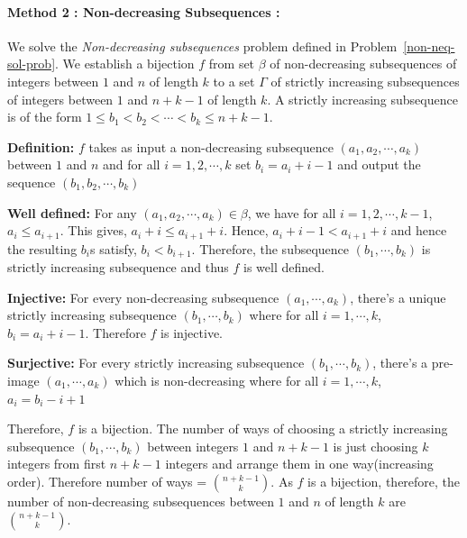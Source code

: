 \paragraph{Method 2 : Non-decreasing Subsequences : } We solve the \emph{Non-decreasing subsequences} problem defined in Problem~\ref{non-neq-sol-prob}. We establish a bijection $f$ from set $\beta$ of non-decreasing subsequences of integers between $1$ and $n$ of length $k$ to a set $\Gamma$ of strictly increasing subsequences of integers between $1$ and $n+k-1$ of length $k$. A strictly increasing subsequence is of the form $1\leq b_1<b_2<\cdots<b_k\leq n+k-1$.
\begin{description}
\item{\textbf{Definition:}} $f$ takes as input a non-decreasing subsequence $(a_1,a_2,\cdots,a_k)$ between $1$ and $n$ and for all $i=1,2,\cdots,k$ set $b_i = a_i+i-1$ and output the sequence $(b_1,b_2,\cdots,b_k)$
\item{\textbf{Well defined:}} For any $(a_1,a_2,\cdots,a_k)\in\beta$, we have for all $i=1,2,\cdots,k-1$, 
$a_i \leq a_{i+1}$. This gives, $a_i+i \leq a_{i+1}+i$. Hence, $a_i+i-1 < a_{i+1}+i$ and hence the resulting $b_i$s satisfy, $b_i < b_{i+1}$.
Therefore, the subsequence $(b_1,\cdots,b_k)$ is strictly increasing subsequence and thus $f$ is well defined.
\item{\textbf{Injective:}} For every non-decreasing subsequence $(a_1,\cdots,a_k)$, there's a unique strictly increasing subsequence $(b_1,\cdots,b_k)$ where for all $i=1,\cdots,k$, $b_i = a_i+i-1$. Therefore $f$ is injective.
\item{\textbf{Surjective:}} For every strictly increasing subsequence $(b_1,\cdots,b_k)$, there's a pre-image $(a_1,\cdots,a_k)$ which is non-decreasing where for all $i=1,\cdots,k$, $a_i=b_i-i+1$
\end{description}


Therefore, $f$ is a bijection. The number of ways of choosing a strictly increasing subsequence $(b_1,\cdots,b_k)$ between integers $1$ and $n+k-1$ is just choosing $k$ integers from first $n+k-1$ integers and arrange them in one way(increasing order). Therefore number of ways = $\binom{n+k-1}{k}$. As $f$ is a bijection, therefore, the number of non-decreasing subsequences between $1$ and $n$ of length $k$ are $\binom{n+k-1}{k}$.


